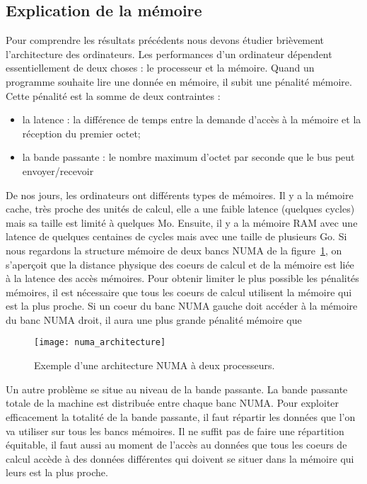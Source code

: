 \subsection{Explication de la mémoire}
Pour comprendre les résultats précédents nous devons étudier brièvement l'architecture des ordinateurs.
%
Les performances d'un ordinateur dépendent essentiellement de deux choses : le processeur et la mémoire.
%
Quand un programme souhaite lire une donnée en mémoire, il subit une pénalité mémoire.
%
Cette pénalité est la somme de deux contraintes :
\begin{itemize}
        \item la latence : la différence de temps entre la demande d'accès à la mémoire et la réception du premier octet;
        \item la bande passante : le nombre maximum d'octet par seconde que le bus peut envoyer/recevoir
\end{itemize}
%
De nos jours, les ordinateurs ont différents types de mémoires.
%
Il y a la mémoire cache, très proche des unités de calcul, elle a une faible latence (quelques cycles) mais sa taille est limité à quelques Mo.
%
Ensuite, il y a la mémoire RAM avec une latence de quelques centaines de cycles mais avec une taille de plusieurs Go.
%
Si nous regardons la structure mémoire de deux bancs NUMA de la figure~\ref{fig:numa_architecture}, on s'aperçoit que la distance physique des coeurs de calcul et de la mémoire est liée à la latence des accès mémoires.
%
Pour obtenir limiter le plus possible les pénalités mémoires, il est nécessaire que tous les coeurs de calcul utilisent la mémoire qui est la plus proche.
%
Si un coeur du banc NUMA gauche doit accéder à la mémoire du banc NUMA droit, il aura une plus grande pénalité mémoire que

\begin{figure}[t!]
  \centering
  \texttt{[image: numa\_architecture]}
  \caption{Exemple d'une architecture NUMA à deux processeurs.}
  \label{fig:numa_architecture}
\end{figure}

Un autre problème se situe au niveau de la bande passante.
%
La bande passante totale de la machine est distribuée entre chaque banc NUMA.
%
Pour exploiter efficacement la totalité de la bande passante, il faut répartir les données que l'on va utiliser sur tous les bancs mémoires.
%
Il ne suffit pas de faire une répartition équitable, il faut aussi au moment de l'accès au données que tous les coeurs de calcul accède à des données différentes qui doivent se situer dans la mémoire qui leurs est la plus proche.
